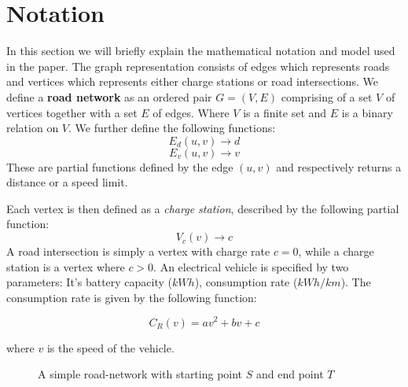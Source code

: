 \section{Notation}
In this section we will briefly explain the mathematical notation and model used in the paper. The graph representation consists of edges which represents roads and vertices which represents either charge stations or road intersections. We define a \textbf{road network} as an ordered pair \(G=(V,E)\) comprising of a set $V$ of vertices together with a set $E$ of edges. Where $V$ is a finite set and $E$ is a binary relation on $V$. We further define the following functions:
\[ E_d(u,v)\rightarrow d \] 
\[ E_v(u,v)\rightarrow v \] 
These are partial functions defined by the edge $(u,v)$ and respectively returns a distance or a speed limit.

Each vertex is then defined as a \textit{charge station}, described by the following partial function:
\[V_c(v)\rightarrow c\]
A road intersection is simply a vertex with charge rate $c = 0$, while a charge station is a vertex where $c > 0$. An electrical vehicle is specified by two parameters: It's battery capacity ($kWh$), consumption rate ($kWh/km$). The consumption rate is given by the following function:

\[C_R(v)=av^2+bv+c\]

where $v$ is the speed of the vehicle. 

\begin{figure}
\caption{A simple road-network with starting point $S$ and end point $T$}
\label{fig:simpleroad-network}
\end{figure}